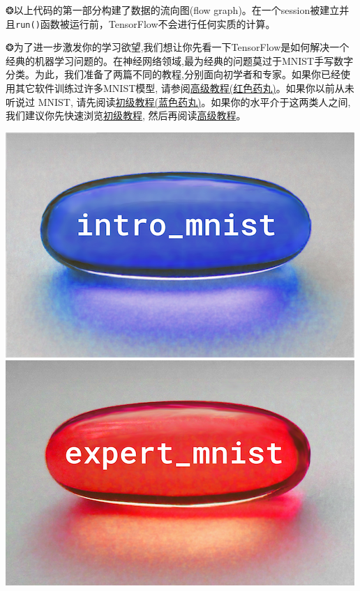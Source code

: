 
❂以上代码的第一部分构建了数据的流向图(flow graph)。在一个session被建立并且\lstinline{run()}函数被运行前，TensorFlow不会进行任何实质的计算。

❂为了进一步激发你的学习欲望,我们想让你先看一下TensorFlow是如何解决一个经典的机器学习问题的。在神经网络领域,最为经典的问题莫过于MNIST手写数字分类。为此，我们准备了两篇不同的教程,分别面向初学者和专家。如果你已经使用其它软件训练过许多MNIST模型, 请参阅\hyperref[MINIST_pros]{高级教程(红色药丸)}。如果你以前从未听说过 MNIST, 请先阅读\hyperref[MINIST_beginner]{初级教程(蓝色药丸)}。如果你的水平介于这两类人之间,我们建议你先快速浏览\hyperref[MINIST_beginner]{初级教程}, 然后再阅读\hyperref[MINIST_pros]{高级教程}。



\begin{center}
\includegraphics[width=.45\textwidth]{../SOURCE/images/blue_pill.png}
\includegraphics[width=.45\textwidth]{../SOURCE/images/red_pill.png}
\end{center}


